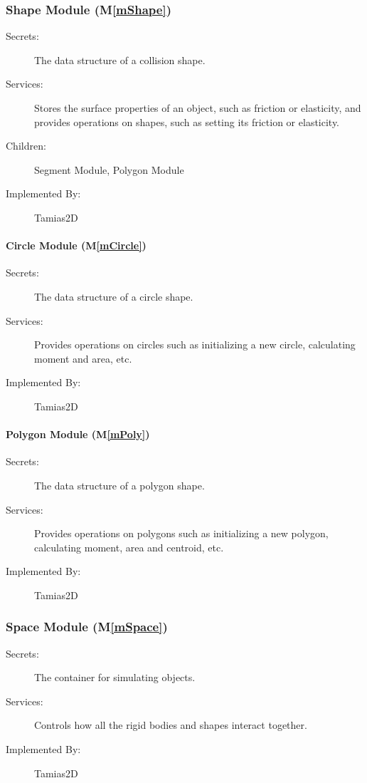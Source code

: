 \documentclass[12pt]{article}
\newcommand{\mref}[1]{M\ref{#1}}
\newcommand{\progname}{Tamias2D}
\begin{document}
\subsubsection{Shape Module (\mref{mShape})}

\begin{description}
\item[Secrets:]The data structure of a collision shape.
\item[Services:]Stores the surface properties of an object, such as friction or elasticity, and provides operations on shapes, such as setting its friction or elasticity.
\item[Children:] Segment Module, Polygon Module
\item[Implemented By:] {\progname}
\end{description}

\paragraph{Circle Module (\mref{mCircle})}

\begin{description}
	\item[Secrets:] The data structure of a circle shape.
	\item[Services:] Provides operations on circles such as initializing a new circle, calculating moment and area, etc.
	\item[Implemented By:] {\progname}
\end{description}


\paragraph{Polygon Module (\mref{mPoly})}

\begin{description}
	\item[Secrets:] The data structure of a polygon shape.
	\item[Services:] Provides operations on polygons such as initializing a new polygon, calculating moment, area and centroid, etc.
	\item[Implemented By:] {\progname}
\end{description}

\subsubsection{Space Module (\mref{mSpace})}

\begin{description}
	\item[Secrets:] The container for simulating objects.
	\item[Services:]Controls how all the rigid bodies and shapes interact together.
	\item[Implemented By:] {\progname}
\end{description} 
 
\end{document}
